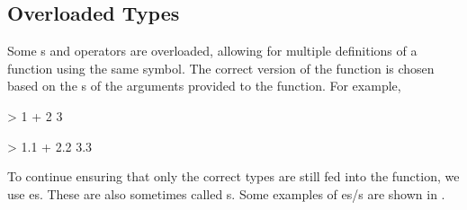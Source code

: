 \subsection{Overloaded Types}\label{subsec:Overloaded_Types}
Some s and operators are overloaded, allowing for multiple definitions of a function using the same symbol.
The correct version of the function is chosen based on the s of the arguments provided to the function.
For example,
\begin{haskellsource}
> 1 + 2
3

> 1.1 + 2.2
3.3
\end{haskellsource}

To continue ensuring that only the correct types are still fed into the function, we use es.
These are also sometimes called s.
Some examples of es/s are shown in .


